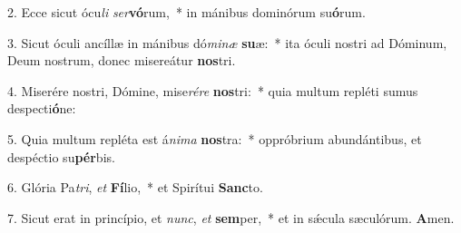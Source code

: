 2. Ecce sicut ócu\textit{li} \textit{ser}\textbf{vó}rum,~*  in mánibus dominórum su\textbf{ó}rum.\

3. Sicut óculi ancíllæ in mánibus dó\textit{mi}\textit{næ} \textbf{su}æ:~*  ita óculi nostri ad Dóminum, Deum nostrum, donec misereátur \textbf{nos}tri.\

4. Miserére nostri, Dómine, mise\textit{ré}\textit{re} \textbf{nos}tri:~*  quia multum repléti sumus despecti\textbf{ó}ne:\

5. Quia multum repléta est á\textit{ni}\textit{ma} \textbf{nos}tra:~*  oppróbrium abundántibus, et despéctio su\textbf{pér}bis.\

6. Glória Pa\textit{tri}, \textit{et} \textbf{Fí}lio,~*  et Spirítui \textbf{Sanc}to.\

7. Sicut erat in princípio, et \textit{nunc}, \textit{et} \textbf{sem}per,~*  et in sǽcula sæculórum. \textbf{A}men.\

